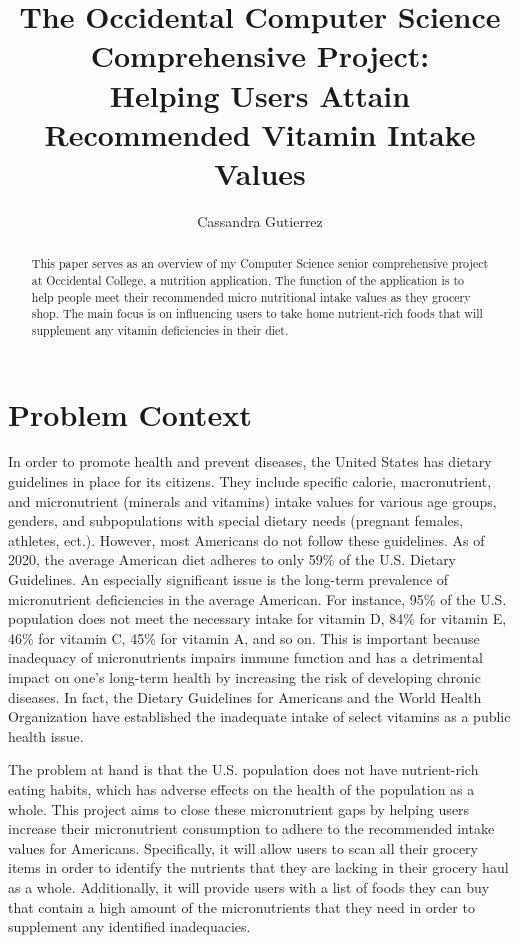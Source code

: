 \documentclass[10pt,twocolumn]{article}
\title{The Occidental Computer Science Comprehensive Project: \\ Helping Users Attain Recommended Vitamin Intake Values}
\author{Cassandra Gutierrez}
\affiliation{Occidental College}
\begin{document}
\maketitle

\begin{abstract}
This paper serves as an overview of my Computer Science senior comprehensive project at Occidental College, a nutrition application. The function of the application is to help people meet their recommended micro nutritional intake values as they grocery shop. The main focus is on influencing users to take home nutrient-rich foods that will supplement any vitamin deficiencies in their diet. 
\end{abstract}

\section{Problem Context}

In order to promote health and prevent diseases, the United States has dietary guidelines in place for its citizens. They include specific calorie, macronutrient, and micronutrient (minerals and vitamins) intake values for various age groups, genders, and subpopulations with special dietary needs (pregnant females, athletes, ect.). However, most Americans do not follow these guidelines. As of 2020, the average American diet adheres to only 59\% of the U.S. Dietary Guidelines.\cite{DGM} An especially significant issue is the long-term prevalence of micronutrient deficiencies in the average American. For instance, 95\% of the U.S. population does not meet the necessary intake for vitamin D, 84\% for vitamin E, 46\% for vitamin C, 45\% for vitamin A, and so on. This is important because inadequacy of micronutrients impairs immune function and has a detrimental impact on one’s long-term health by increasing the risk of developing chronic diseases.\cite{drake_2022} In fact, the Dietary Guidelines for Americans and the World Health Organization have established the inadequate intake of select vitamins as a public health issue.\cite{NHANES_2020}  

The problem at hand is that the U.S. population does not have nutrient-rich eating habits, which has adverse effects on the health of the population as a whole. This project aims to close these micronutrient gaps by helping users increase their micronutrient consumption to adhere to the recommended intake values for Americans. Specifically, it will allow users to scan all their grocery items in order to identify the nutrients that they are lacking in their grocery haul as a whole. Additionally, it will provide users with a list of foods they can buy that contain a high amount of the micronutrients that they need in order to supplement any identified inadequacies. 
\end{document}
